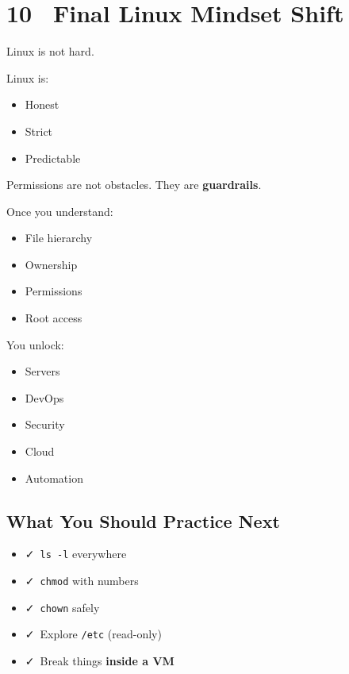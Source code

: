 \documentclass[12pt]{article}
\newcommand{\penguinicon}{\faLinux}
\newcommand{\checkicon}{\faCheck}
\begin{document}
\section*{10 \penguinicon\ Final Linux Mindset Shift}

Linux is not hard.

Linux is:

\begin{itemize}
    \item Honest
    \item Strict
    \item Predictable
\end{itemize}

Permissions are not obstacles.
They are \textbf{guardrails}.

Once you understand:

\begin{itemize}
    \item File hierarchy
    \item Ownership
    \item Permissions
    \item Root access
\end{itemize}

You unlock:

\begin{itemize}
    \item Servers
    \item DevOps
    \item Security
    \item Cloud
    \item Automation
\end{itemize}

\subsection*{What You Should Practice Next}

\begin{itemize}
    \item \checkicon\ \texttt{ls -l} everywhere
    \item \checkicon\ \texttt{chmod} with numbers
    \item \checkicon\ \texttt{chown} safely
    \item \checkicon\ Explore \texttt{/etc} (read-only)
    \item \checkicon\ Break things \textbf{inside a VM}
\end{itemize}
\end{document}
